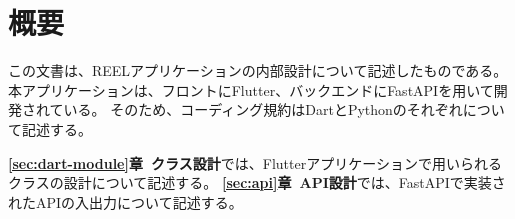 \section{概要}
この文書は、REELアプリケーションの内部設計について記述したものである。
本アプリケーションは、フロントにFlutter、バックエンドにFastAPIを用いて開発されている。
そのため、コーディング規約はDartとPythonのそれぞれについて記述する。
\par
\textbf{\ref{sec:dart-module}章~クラス設計}では、Flutterアプリケーションで用いられるクラスの設計について記述する。
\textbf{\ref{sec:api}章~API設計}では、FastAPIで実装されたAPIの入出力について記述する。
